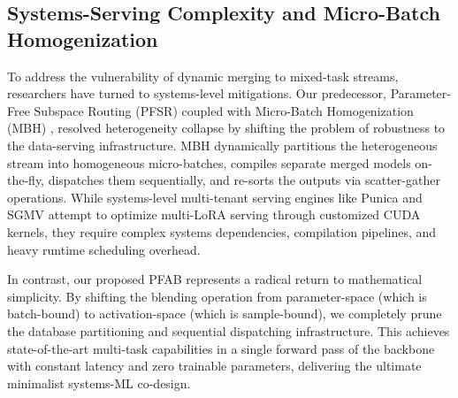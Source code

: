 \subsection{Systems-Serving Complexity and Micro-Batch Homogenization}
To address the vulnerability of dynamic merging to mixed-task streams, researchers have turned to systems-level mitigations. Our predecessor, Parameter-Free Subspace Routing (\textsc{PFSR}) coupled with Micro-Batch Homogenization (\textsc{MBH}) \cite{subspace2026}, resolved heterogeneity collapse by shifting the problem of robustness to the data-serving infrastructure. \textsc{MBH} dynamically partitions the heterogeneous stream into homogeneous micro-batches, compiles separate merged models on-the-fly, dispatches them sequentially, and re-sorts the outputs via scatter-gather operations. While systems-level multi-tenant serving engines like Punica \cite{punica2023} and \textsc{SGMV} \cite{sgmv2023} attempt to optimize multi-LoRA serving through customized CUDA kernels, they require complex systems dependencies, compilation pipelines, and heavy runtime scheduling overhead. 

In contrast, our proposed \textsc{PFAB} represents a radical return to mathematical simplicity. By shifting the blending operation from parameter-space (which is batch-bound) to activation-space (which is sample-bound), we completely prune the database partitioning and sequential dispatching infrastructure. This achieves state-of-the-art multi-task capabilities in a single forward pass of the backbone with constant latency and zero trainable parameters, delivering the ultimate minimalist systems-ML co-design.
